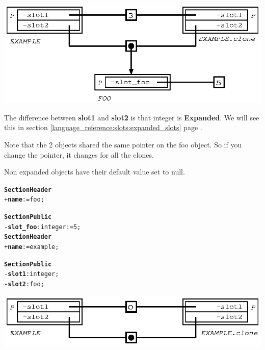 \documentclass[11pt]{mybook}
\begin{document}
\begin{center}
\includegraphics[scale=1.0]{figures/shared_slot}
\end{center}

The difference between {\bf{}slot1} and {\bf{}slot2} is that {\sc{}integer} is {\bf{}Expanded}.
We will see this in section {\ref{language_reference:slots:expanded_slots}} page \pageref{language_reference:slots:expanded_slots}.

Note that the 2 objects shared the same pointer on the {\sc{}foo} object. So if you change the pointer, it changes for all the clones.

Non expanded objects have their default value set to {\sc{}null}.

\begin{alltt}
{\bf{}Section Header}
  + {\bf{}name} := {\sc{}foo};

{\bf{}Section Public}
  - {\bf{}slot\_foo}:{\sc{}integer} := 5;\\

{\bf{}Section Header}
  + {\bf{}name} := {\sc{}example};

{\bf{}Section Public}
  - {\bf{}slot1}:{\sc{}integer};
  - {\bf{}slot2}:{\sc{}foo};
\end{alltt}

\begin{center}
\includegraphics[scale=1.0]{figures/shared_slot2}
\end{center}
\end{document}
